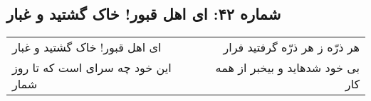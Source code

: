 \begin{center}
\section*{شماره ۴۲: ای اهل قبور! خاک گشتید و غبار}
\label{sec:042}
\begin{longtable}{l p{0.5cm} r}
ای اهل قبور! خاک گشتید و غبار
&&
هر ذرّه ز هر ذرّه گرفتید فرار
\\
این خود چه سرای است که تا روز شمار
&&
بی خود شدهاید و بیخبر از همه کار
\\
\end{longtable}
\end{center}
